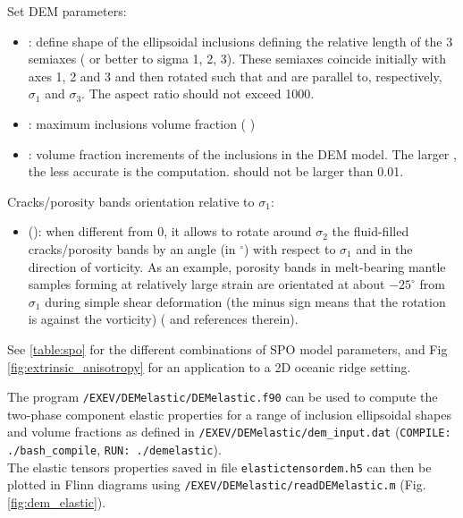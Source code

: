 Set DEM parameters:
\begin{itemize}
    \item {}: define shape of the ellipsoidal inclusions defining the relative length of the 3 semiaxes ( or better to sigma 1, 2, 3). These semiaxes coincide initially with axes 1, 2 and 3 and then rotated such that  and  are parallel to, respectively, $\sigma_1$ and $\sigma_3$. The aspect ratio should not exceed 1000.
    \item {}: maximum inclusions volume fraction ( )
    \item {}: volume fraction increments of the inclusions in the DEM model. The larger , the less accurate is the computation.  should not be larger than 0.01. 
\end{itemize}
Cracks/porosity bands orientation relative to $\sigma_1$:
\begin{itemize}
    \item {} (): when different from 0, it allows to rotate around $\sigma_2$ the fluid-filled cracks/porosity bands by an angle  (in $^{\circ}$) with respect to $\sigma_1$ and in the direction of vorticity. As an example, porosity bands in melt-bearing mantle samples forming at relatively large strain are orientated at about $-25^{\circ}$ from $\sigma_1$ during simple shear deformation (the minus sign means that the rotation is against the vorticity) (\citet{katz2006} and references therein).
\end{itemize}



See \ref{table:spo} for the different combinations of SPO model parameters, and Fig \ref{fig:extrinsic_anisotropy} for an application to a 2D oceanic ridge setting.

The program \texttt{/EXEV/DEMelastic/DEMelastic.f90} can be used to compute the two-phase component elastic properties for a range of inclusion ellipsoidal shapes and volume fractions as defined in \texttt{/EXEV/DEMelastic/dem\_input.dat} (\texttt{COMPILE: ./bash\_compile},
 \texttt{RUN: ./demelastic}). \\
The elastic tensors properties saved in file \texttt{elastictensordem.h5} can then be plotted in Flinn diagrams using \texttt{/EXEV/DEMelastic/readDEMelastic.m} (Fig. \ref{fig:dem_elastic}).

